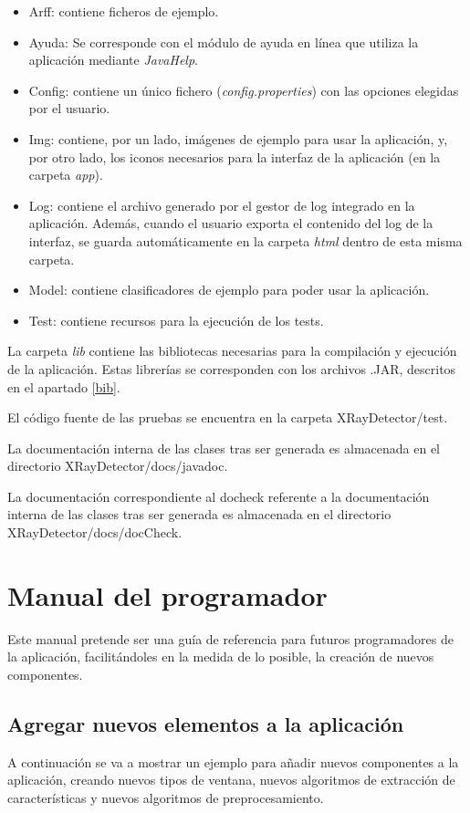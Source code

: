 \begin{itemize}
\item Arff: contiene ficheros \arff{} de ejemplo.
\item Ayuda: Se corresponde con el módulo de ayuda en línea que utiliza la aplicación mediante \textit{JavaHelp}.
\item Config: contiene un único fichero (\textit{config.properties}) con las opciones elegidas por el usuario.
\item Img: contiene, por un lado, imágenes de ejemplo para usar la aplicación, y, por otro lado, los iconos necesarios para la interfaz de la aplicación (en la carpeta \textit{app}).
\item Log: contiene el archivo generado por el gestor de log integrado en la aplicación. Además, cuando el usuario exporta el contenido del log de la interfaz, se guarda automáticamente en la carpeta \textit{html} dentro de esta misma carpeta.
\item Model: contiene clasificadores de ejemplo para poder usar la aplicación.
\item Test: contiene recursos para la ejecución de los tests.
\end{itemize}

La carpeta \textit{lib} contiene las bibliotecas necesarias para la compilación y ejecución de la aplicación. Estas librerías se corresponden con los archivos .JAR, descritos en el apartado \ref{bib}.

El código fuente de las pruebas se encuentra en la carpeta XRayDetector/test.

La documentación interna de las clases tras ser generada es almacenada en el directorio XRayDetector/docs/javadoc.

La documentación correspondiente al docheck referente a la documentación interna de las clases tras ser generada es almacenada en el directorio XRayDetector/docs/docCheck.

\section{Manual del programador}
Este manual pretende ser una guía de referencia para futuros programadores de la aplicación, facilitándoles en la medida de lo posible, la creación de nuevos componentes.

\subsection{Agregar nuevos elementos a la aplicación}
A continuación se va a mostrar un ejemplo para añadir nuevos componentes a la aplicación, creando nuevos tipos de ventana, nuevos algoritmos de extracción de características y nuevos algoritmos de preprocesamiento.

